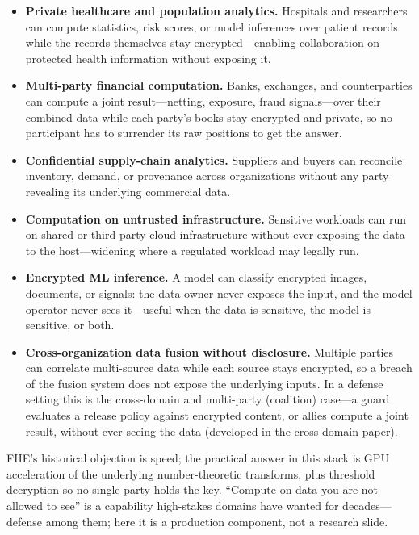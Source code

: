 \documentclass[11pt,letterpaper]{article}
\begin{document}
\begin{itemize}
  \item \textbf{Private healthcare and population analytics.} Hospitals and
  researchers can compute statistics, risk scores, or model inferences over
  patient records while the records themselves stay encrypted---enabling
  collaboration on protected health information without exposing it.
  \item \textbf{Multi-party financial computation.} Banks, exchanges, and
  counterparties can compute a joint result---netting, exposure, fraud
  signals---over their combined data while each party's books stay encrypted and
  private, so no participant has to surrender its raw positions to get the answer.
  \item \textbf{Confidential supply-chain analytics.} Suppliers and buyers can
  reconcile inventory, demand, or provenance across organizations without any
  party revealing its underlying commercial data.
  \item \textbf{Computation on untrusted infrastructure.} Sensitive workloads can
  run on shared or third-party cloud infrastructure without ever exposing the data
  to the host---widening where a regulated workload may legally run.
  \item \textbf{Encrypted ML inference.} A model can classify encrypted images,
  documents, or signals: the data owner never exposes the input, and the model
  operator never sees it---useful when the data is sensitive, the model is
  sensitive, or both.
  \item \textbf{Cross-organization data fusion without disclosure.} Multiple
  parties can correlate multi-source data while each source stays encrypted, so a
  breach of the fusion system does not expose the underlying inputs. In a defense
  setting this is the cross-domain and multi-party (coalition) case---a guard
  evaluates a release policy against encrypted content, or allies compute a joint
  result, without ever seeing the data (developed in the cross-domain paper).
\end{itemize}

FHE's historical objection is speed; the practical answer in this stack is
GPU acceleration of the underlying number-theoretic transforms, plus threshold
decryption so no single party holds the key. ``Compute on data you are not allowed
to see'' is a capability high-stakes domains have wanted for decades---defense
among them; here it is a production component, not a research slide.

\end{document}
